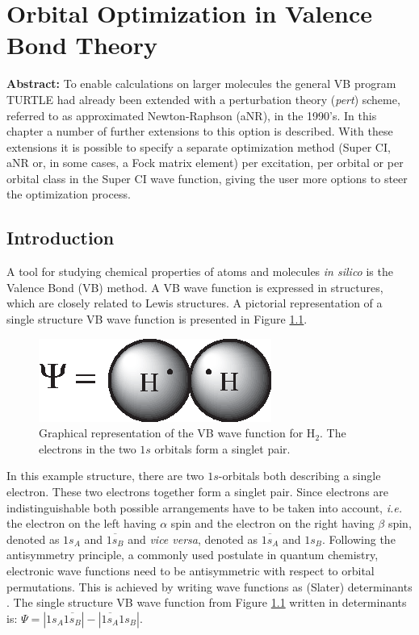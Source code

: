 \chapter{Orbital Optimization in Valence Bond Theory}
\label{chap_orbopt}


\noindent\textbf{Abstract:} To enable calculations on larger molecules the general VB program TURTLE  had already been extended with a perturbation theory (\textit{pert}) scheme, referred to as approximated Newton-Raphson (aNR), in the 1990's. In this chapter a number of further extensions to this option is described. With these extensions it is possible to specify a separate optimization method (Super CI, aNR or, in some cases, a Fock matrix element) per excitation, per orbital or per orbital class in the Super CI wave function, giving the user more options to steer the optimization process.

\newpage

\section{Introduction}

A tool for studying chemical properties of atoms and molecules \textit{in silico} is the Valence Bond (VB) \cite{heitler,weeny1,weeny2,weeny3} method. A VB wave function is expressed in structures, which are closely related to Lewis structures. A pictorial representation of a single structure VB wave function is presented in Figure \ref{ch2.fig.heitler}.  
\begin{figure}[ht]
\center
\includegraphics{orbopt/figures/heitler.eps}
\caption{Graphical representation of the VB wave function for H$_2$. The electrons in the two $1s$ orbitals form a singlet pair.}
\label{ch2.fig.heitler}
\end{figure}
In this example structure, there are two $1s$-orbitals both describing a single electron. These two electrons together form a singlet pair. Since electrons are indistinguishable both possible arrangements have to be taken into account, \textit{i.e.} the electron on the left having $\alpha$ spin and the electron on the right having $\beta$ spin, denoted as $1s_{A}$ and $\overline{1s_{B}}$ and \textit{vice versa}, denoted as $\overline{1s_{A}}$ and $1s_{B}$. Following the antisymmetry principle, a commonly used postulate in quantum chemistry, electronic wave functions need to be antisymmetric with respect to orbital permutations. This is achieved by writing wave functions as (Slater) determinants \cite{slater}. The single structure VB wave function from Figure \ref{ch2.fig.heitler} written in determinants is: $\Psi = |1s_{A}\overline{1s_{B}}| - |\overline{1s_{A}}1s_{B}|$.
 

